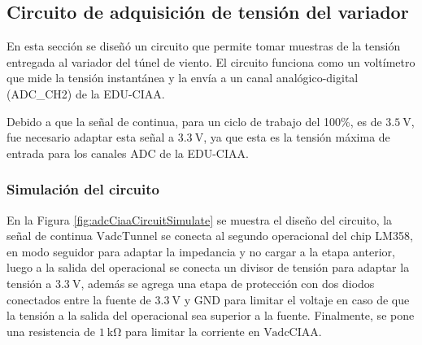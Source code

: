 \subsection{Circuito de adquisición de tensión del variador}\label{sec:adquisicionVadcTunel}

En esta sección se diseñó un circuito que permite tomar muestras de la tensión entregada al variador del túnel de viento. El circuito funciona como un voltímetro que mide la tensión instantánea y la envía a un canal analógico-digital (ADC\_CH2) de la EDU-CIAA. 

Debido a que la señal de continua, para un ciclo de trabajo del 100\%, es de $\SI{3.5}{\volt}$, fue necesario adaptar esta señal a $\SI{3.3}{\volt}$, ya que esta es la tensión máxima de entrada para los canales ADC de la EDU-CIAA.

\subsubsection{Simulación del circuito}

En la Figura \ref{fig:adcCiaaCircuitSimulate} se muestra el diseño del circuito, la señal de continua $\text{VadcTunnel}$ se conecta al segundo operacional del chip LM358, en modo seguidor para adaptar la impedancia y no cargar a la etapa anterior, luego a la salida del operacional se conecta un divisor de tensión para adaptar la tensión a $\SI{3.3}{\volt}$, además se agrega una etapa de protección con dos diodos conectados entre la fuente de $\SI{3.3}{\volt}$ y GND para limitar el voltaje en caso de que la tensión a la salida del operacional sea superior a la fuente. Finalmente, se pone una resistencia de $\SI{1}{\kilo\ohm}$ para limitar la corriente en  $\text{VadcCIAA}$.

